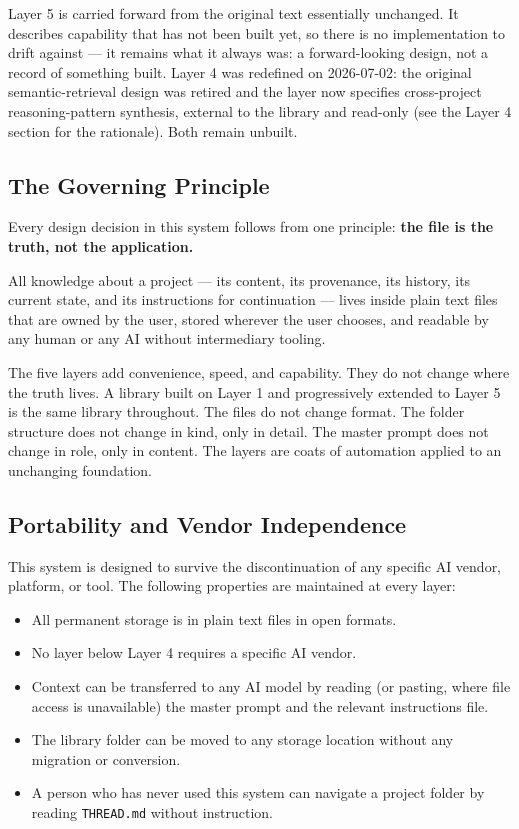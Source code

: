 \documentclass[12pt,letterpaper]{article}
\begin{document}
Layer 5 is carried forward from the original text essentially
unchanged. It describes capability that has not been built yet, so
there is no implementation to drift against --- it remains what it
always was: a forward-looking design, not a record of something built.
Layer 4 was redefined on 2026-07-02: the original semantic-retrieval
design was retired and the layer now specifies cross-project
reasoning-pattern synthesis, external to the library and read-only
(see the Layer 4 section for the rationale). Both remain unbuilt.

\subsection{The Governing Principle}

Every design decision in this system follows from one principle:
\textbf{the file is the truth, not the application.}

All knowledge about a project --- its content, its provenance, its history,
its current state, and its instructions for continuation --- lives inside
plain text files that are owned by the user, stored wherever the user chooses,
and readable by any human or any AI without intermediary tooling.

The five layers add convenience, speed, and capability. They do not change
where the truth lives. A library built on Layer 1 and progressively extended
to Layer 5 is the same library throughout. The files do not change format.
The folder structure does not change in kind, only in detail. The master
prompt does not change in role, only in content. The layers are coats of
automation applied to an unchanging foundation.

\subsection{Portability and Vendor Independence}

This system is designed to survive the discontinuation of any specific
AI vendor, platform, or tool. The following properties are maintained
at every layer:

\begin{itemize}
  \item All permanent storage is in plain text files in open formats.
  \item No layer below Layer 4 requires a specific AI vendor.
  \item Context can be transferred to any AI model by reading (or pasting,
        where file access is unavailable) the master prompt and the
        relevant instructions file.
  \item The library folder can be moved to any storage location
        without any migration or conversion.
  \item A person who has never used this system can navigate a project
        folder by reading \texttt{THREAD.md} without instruction.
\end{itemize}
\end{document}
